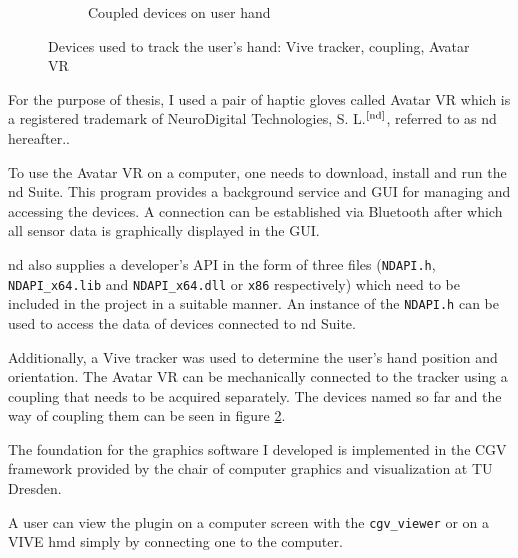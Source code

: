 \documentclass[hyperref, bachelorofscience]{cgvpub}
\newcommand{\newcite}[1]{$ ^{\text{\cite{#1}}} $}
\begin{document}
\begin{figure}
\begin{subfigure}{.49\linewidth}
		\caption{Coupled devices on user hand}
		\label{fig:devices:cou}
	\end{subfigure}
	\caption[Devices used to track the user's hand]{Devices used to track the user's hand: Vive tracker, coupling, Avatar VR}
	\label{fig:devices}
\end{figure}

For the purpose of thesis, I used a pair of haptic gloves called Avatar VR which is a registered trademark of NeuroDigital Technologies, S. L.\newcite{nd}, referred to as \acrshort{nd} hereafter..

To use the Avatar VR on a computer, one needs to download, install and run the \acrshort{nd} Suite. This program provides a background service and GUI for managing and accessing the devices. A connection can be established via Bluetooth after which all sensor data is graphically displayed in the GUI.

\acrshort{nd} also supplies a developer's API in the form of three files (\lstinline|NDAPI.h|, \lstinline|NDAPI_x64.lib| and \lstinline|NDAPI_x64.dll| or \lstinline|x86| respectively) which need to be included in the project in a suitable manner. An instance of the \lstinline|NDAPI.h| can be used to access the data of devices connected to \acrshort{nd} Suite.

Additionally, a Vive tracker was used to determine the user's hand position and orientation. The Avatar VR can be mechanically connected to the tracker using a coupling that needs to be acquired separately. The devices named so far and the way of coupling them can be seen in figure \ref{fig:devices}.

The foundation for the graphics software I developed is implemented in the \gls{CGV} framework provided by the chair of computer graphics and visualization at TU Dresden.

A user can view the plugin on a computer screen with the \lstinline|cgv_viewer| or on a \Gls{VIVE} \acrfull{hmd} simply by connecting one to the computer.
\end{document}
